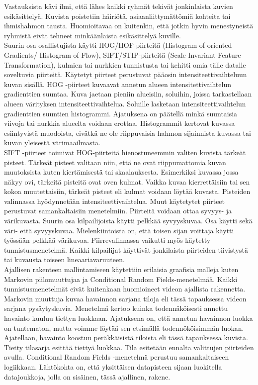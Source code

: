 Vastauksista kävi ilmi, että lähes kaikki ryhmät tekivät jonkinlaista kuvien esikäsittelyä. Kuvista poistetiin häiriötä, asiaanliittymättömiä 
kohteita tai ihmishahmon tausta. Huomioitavaa on kuitenkin, että jotkin hyvin menestyneistä ryhmistä eivät tehneet minkäänlaista esikäsittelyä kuville.
\citep {6239178}\\

Suurin osa osallistujista käytti HOG/HOF-piirteitä (Histogram of oriented Gradients/ Histogram of Flow), SIFT/STIP-piirteitä (Scale Invariant Feature Transformation), 
kulmien tai nurkkien tunnistusta tai kehitti omia tälle datalle soveltuvia piirteitä. Käytetyt piirteet perustuvat pääosin intensiteettivaihteluun 
kuvan sisällä. HOG -piirteet kuvaavat annetun alueen intensitettivaihtelun gradienttien suuntaa. Kuva jaetaan pieniin alueisiin, soluihin, 
joissa tarkastellaan alueen värityksen intensiteettivaihtelua. Soluille lasketaan intensiteettivaihtelun gradienttien suuntien histogrammi. 
Ajatuksena on päätellä minkä suuntaisia viivoja tai nurkkia alueelta voidaan erottaa.\citep {1467360} Histogrammit kertovat kuvassa esiintyvistä
muodoista, eivätkä ne ole riippuvaisia hahmon sijainnista kuvassa tai kuvan yleisestä värimaailmasta. \\

SIFT -piirteet toimivat HOG-piirteitä hienostuneemmin valiten kuvista tärkeät pisteet. Tärkeät pisteet valitaan niin, että ne ovat riippumattomia
kuvan muutoksista kuten kiertämisestä tai skaalauksesta. \citep {790410} Esimerkiksi kuvassa jossa näkyy ovi, tärkeitä pisteitä ovat oven kulmat.
Vaikka kuvaa kierrettäisiin tai sen kokoa muutettaisiin, tärkeät pisteet eli kulmat voidaan löytää kuvasta. Pisteiden valinnassa hyödynnetään intensiteettivaihtelua.
Muut käytetytet piirteet perustuvat samankaltaisiin menetelmiin. Piirteitä voidaan ottaa syvyys- ja värikuvasta.
Suurin osa kilpailijoista käytti pelkkää syvyyskuvaa. Osa käytti sekä väri- että syvyyskuvaa. 
Mielenkiintoista on, että toisen sijan voittaja käytti työssään pelkkää värikuvaa. Piirrevalinnassa vaikutti myös käytetty tunnistusmenetelmä. 
Kaikki kilpailijat käyttivät jonkilaista piirteiden tiivistystä tai kuvausta toiseen lineaariavaruuteen.\\ 

Ajallisen rakenteen mallintamiseen käytettiin erilaisia graafisia malleja kuten Markovin piilomuuttujaa ja Conditional Random Fields-menetelmää. 
Kaikki tunnistusmenetelmät eivät kuitenkaan huomioineet videon ajallista rakennetta. 
Markovin muuttuja kuvaa havainnon sarjana tiloja eli tässä tapauksessa videon sarjana pysäytyskuvia. Menetelmä kertoo kuinka todennäköisesti annettu havainto 
kuuluu tiettyn luokkaan. Ajatuksena on, että annetun havainnon luokka on tuntematon, mutta voimme löytää sen etsimällä todennököisimmän luokan. 
Ajatellaan, havainto koostuu peräkkäisistä tiloista eli tässä tapauksessa kuvista. Tietty tilasarja esittää tiettyä luokkaa.
Tila esitetään ennalta valittujen piirteiden avulla. \citep {} Conditional Random Fields -menetelmä perustuu samankaltaiseen logiikkaan. \citep {}
Lähtökohta on, että yksittäisen datapisteen sijaan luokitella datajoukkoja, jolla on sisäinen, tässä ajallinen, rakene.\\

